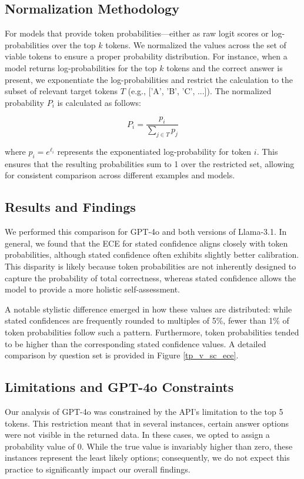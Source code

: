 \documentclass{article}
\begin{document}
\begin{appendices}
\subsection{Normalization Methodology}
For models that provide token probabilities—either as raw logit scores or log-probabilities over the top $k$ tokens. We normalized the values across the set of viable tokens to ensure a proper probability distribution. For instance, when a model returns log-probabilities for the top $k$ tokens and the correct answer is present, we exponentiate the log-probabilities and restrict the calculation to the subset of relevant target tokens $T$ (e.g., ['A', 'B', 'C', ...]). The normalized probability $P_i$ is calculated as follows:

$$P_i = \frac{p_i}{\sum_{j \in T} p_j}$$

where $p_i = e^{\ell_i}$ represents the exponentiated log-probability for token $i$. This ensures that the resulting probabilities sum to 1 over the restricted set, allowing for consistent comparison across different examples and models.

\subsection{Results and Findings}
We performed this comparison for GPT-4o and both versions of Llama-3.1. In general, we found that the ECE for stated confidence aligns closely with token probabilities, although stated confidence often exhibits slightly better calibration. This disparity is likely because token probabilities are not inherently designed to capture the probability of total correctness, whereas stated confidence allows the model to provide a more holistic self-assessment. 

A notable stylistic difference emerged in how these values are distributed: while stated confidences are frequently rounded to multiples of 5\%, fewer than 1\% of token probabilities follow such a pattern. Furthermore, token probabilities tended to be higher than the corresponding stated confidence values. A detailed comparison by question set is provided in Figure \ref{tp_v_sc_ece}.



\subsection{Limitations and GPT-4o Constraints}
Our analysis of GPT-4o was constrained by the API’s limitation to the top 5 tokens. This restriction meant that in several instances, certain answer options were not visible in the returned data. In these cases, we opted to assign a probability value of 0. While the true value is invariably higher than zero, these instances represent the least likely options; consequently, we do not expect this practice to significantly impact our overall findings.



\end{appendices}
\end{document}
